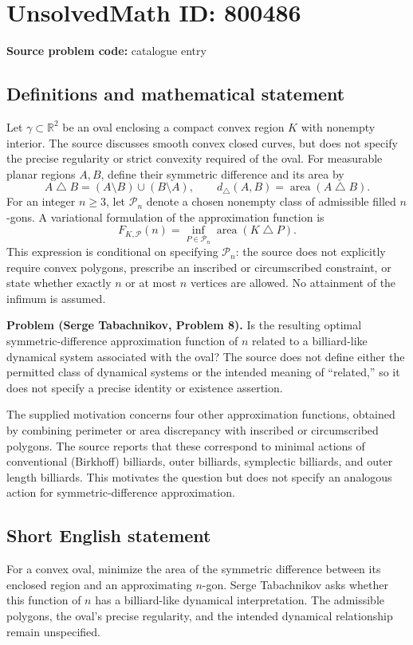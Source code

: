 \documentclass[11pt]{article}
\newcommand{\R}{\mathbb{R}}
\begin{document}
\section*{UnsolvedMath ID: 800486}
\textbf{Source problem code:} catalogue entry
\subsection{Definitions and mathematical statement}
Let \(\gamma\subset\R^2\) be an oval enclosing a compact convex region \(K\) with nonempty interior. The source discusses smooth convex closed curves, but does not specify the precise regularity or strict convexity required of the oval. For measurable planar regions \(A,B\), define their symmetric difference and its area by
\[
A\mathbin{\triangle}B=(A\setminus B)\cup(B\setminus A),\qquad d_{\triangle}(A,B)=\operatorname{area}(A\mathbin{\triangle}B).
\]
For an integer \(n\geq3\), let \(\mathcal P_n\) denote a chosen nonempty class of admissible filled \(n\)-gons. A variational formulation of the approximation function is
\[
F_{K,\mathcal P}(n)=\inf_{P\in\mathcal P_n}\operatorname{area}(K\mathbin{\triangle}P).
\]
This expression is conditional on specifying \(\mathcal P_n\): the source does not explicitly require convex polygons, prescribe an inscribed or circumscribed constraint, or state whether exactly \(n\) or at most \(n\) vertices are allowed. No attainment of the infimum is assumed.

\textbf{Problem (Serge Tabachnikov, Problem 8).} Is the resulting optimal symmetric-difference approximation function of \(n\) related to a billiard-like dynamical system associated with the oval? The source does not define either the permitted class of dynamical systems or the intended meaning of ``related,'' so it does not specify a precise identity or existence assertion.

The supplied motivation concerns four other approximation functions, obtained by combining perimeter or area discrepancy with inscribed or circumscribed polygons. The source reports that these correspond to minimal actions of conventional (Birkhoff) billiards, outer billiards, symplectic billiards, and outer length billiards. This motivates the question but does not specify an analogous action for symmetric-difference approximation.
\subsection{Short English statement}
For a convex oval, minimize the area of the symmetric difference between its enclosed region and an approximating \(n\)-gon. Serge Tabachnikov asks whether this function of \(n\) has a billiard-like dynamical interpretation. The admissible polygons, the oval's precise regularity, and the intended dynamical relationship remain unspecified.
\end{document}
